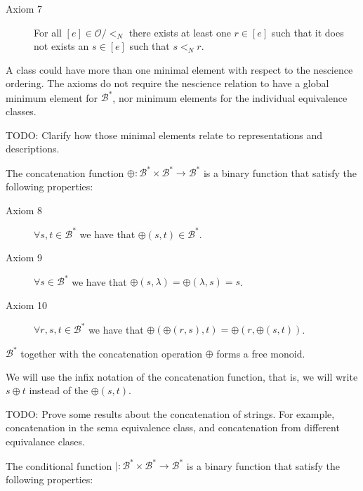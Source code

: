 \begin{description}
\item[Axiom 7] For all $[e] \in \mathcal{O} / <_N$ there exists at least one $r \in [e]$ such that it does not exists an $s \in [e]$ such that $s <_N r$.
\end{description}

\vskip 0.25cm

A class could have more than one minimal element with respect to the nescience ordering. The axioms do not require the nescience relation to have a global minimum element for $\mathcal{B}^\ast$, nor minimum elements for the individual equivalence classes.

{\color{red} TODO: Clarify how those minimal elements relate to representations and descriptions.}

The concatenation function $\oplus : \mathcal{B}^\ast \times \mathcal{B}^\ast \rightarrow \mathcal{B}^\ast$ is a binary function that satisfy the following properties:

\vskip 0.25cm

\begin{description}
\item[Axiom 8] $\forall s, t \in \mathcal{B}^\ast$ we have that $\oplus(s, t) \in \mathcal{B}^\ast$.
\item[Axiom 9] $\forall s \in \mathcal{B}^\ast$ we have that $\oplus(s, \lambda) = \oplus( \lambda, s) = s$.
\item[Axiom 10] $\forall r, s, t \in \mathcal{B}^\ast$ we have that $\oplus(\oplus(r, s), t) = \oplus(r, \oplus(s, t))$.
\end{description}

\vskip 0.25cm

$\mathcal{B}^\ast$ together with the concatenation operation $\oplus$ forms a free monoid.

\begin{notation}
We will use the infix notation of the concatenation function, that is, we will write $s \oplus t$ instead of the $\oplus(s, t)$.
\end{notation}

{\color{red} TODO: Prove some results about the concatenation of strings. For example, concatenation in the sema equivalence class, and concatenation from different equivalance clases.}

The conditional function $\mid : \mathcal{B}^\ast \times \mathcal{B}^\ast \rightarrow \mathcal{B}^\ast$ is a binary function that satisfy the following properties:

